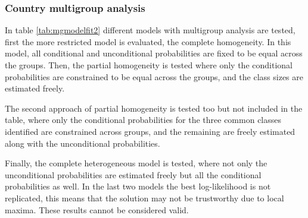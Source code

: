 \documentclass[12pt,a4paper,oneside]{reedthesis}
\begin{document}
\hypertarget{country-multigroup-analysis-1}{%
\subsubsection{Country multigroup analysis}\label{country-multigroup-analysis-1}}

In table \ref{tab:mgmodelfit2} different models with multigroup analysis are tested, first the more restricted model is evaluated, the complete homogeneity. In this model, all conditional and unconditional probabilities are fixed to be equal across the groups. Then, the partial homogeneity is tested where only the conditional probabilities are constrained to be equal across the groups, and the class sizes are estimated freely.

The second approach of partial homogeneity is tested too but not included in the table, where only the conditional probabilities for the three common classes identified are constrained across groups, and the remaining are freely estimated along with the unconditional probabilities.

Finally, the complete heterogeneous model is tested, where not only the unconditional probabilities are estimated freely but all the conditional probabilities as well. In the last two models the best log-likelihood is not replicated, this means that the solution may not be trustworthy due to local maxima. These results cannot be considered valid.
\end{document}
